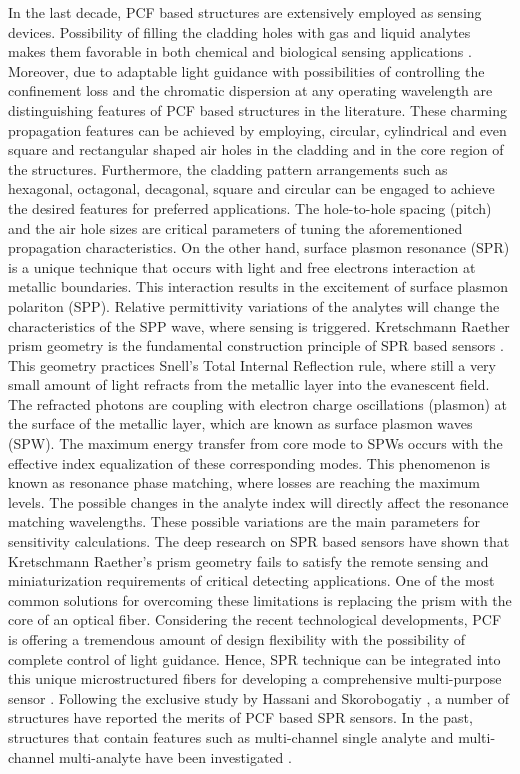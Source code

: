 \documentclass[journal]{IEEEtran}
\begin{document}
In the last decade, PCF based structures are extensively employed as sensing devices. Possibility of filling the cladding holes with gas and liquid analytes makes them favorable in both chemical and biological sensing applications  \cite{wang2011selectively,rifat2016highly,dash2014spr}. Moreover, due to adaptable light guidance with possibilities of controlling the confinement loss and the chromatic dispersion at any operating wavelength are distinguishing features of PCF based structures in the literature. These charming propagation features can be achieved by employing, circular, cylindrical and even square and rectangular shaped   air holes in the cladding and in the core region of the structures. Furthermore, the cladding pattern arrangements such as hexagonal, octagonal, decagonal, square and circular \cite{wang2011selectively,ademgil2014highly} can be engaged to achieve the desired features for preferred applications. The hole-to-hole spacing (pitch) and the air hole sizes are critical parameters of tuning the aforementioned propagation characteristics. On the other hand, surface plasmon resonance (SPR) is a unique technique that occurs with light and free electrons interaction at metallic boundaries. This interaction results in the excitement of surface plasmon polariton (SPP). Relative permittivity variations of the analytes will change the characteristics of the SPP wave, where sensing is triggered. Kretschmann Raether prism geometry is the fundamental construction principle of SPR based sensors  \cite{kretschmann1968radiative}. This geometry practices Snell's Total Internal Reflection rule, where still a very small amount of light refracts from the metallic layer into the evanescent field. The refracted photons are coupling with electron charge oscillations (plasmon) at the surface of the metallic layer, which are known as surface plasmon waves (SPW). The maximum energy transfer from core mode to SPWs occurs with the effective index equalization of these corresponding modes. This phenomenon is known as resonance phase matching, where losses are reaching the maximum levels. The possible changes in the analyte index will directly affect the resonance matching wavelengths. These possible variations are the main parameters for sensitivity calculations. The deep research on SPR based sensors have shown that Kretschmann Raether's prism geometry fails to satisfy the remote sensing and miniaturization requirements of critical detecting applications. One of the most common solutions for overcoming these limitations is replacing the prism with the core of an optical fiber. Considering the recent technological developments, PCF is offering a tremendous amount of design flexibility with the possibility of complete control of light guidance. Hence, SPR technique can be integrated into this unique microstructured fibers for developing a comprehensive multi-purpose sensor \cite{rifat2016highly,yasli2019effect}. Following the exclusive study by Hassani and Skorobogatiy \cite{hassani2006design}, a number of structures have reported the merits of PCF based SPR sensors. In the past, structures that contain features such as multi-channel single analyte and multi-channel multi-analyte have been investigated \cite{rifat2016highly,yasli2019effect,yasli2019multi,azzam2016multichannel}. 
\end{document}
